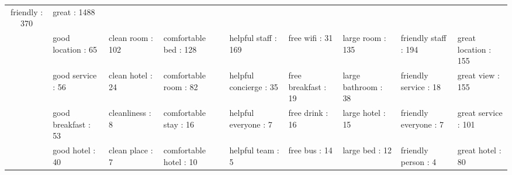 \documentclass[smallextended,natbib]{svjour3}       %
\begin{document}
\begin{landscape}
\begin{table}[p]
{\begin{tabular}{|c|l|l|l|l|l|l|l|l|}
          friendly : 370 &
          great : 1488 \\
         &
          good location : 65 &
          clean room : 102 &
          comfortable bed : 128 &
          helpful staff : 169 &
          free wifi : 31 &
          large room : 135 &
          friendly staff : 194 &
          great location : 155 \\
         &
          good service : 56 &
          clean hotel : 24 &
          comfortable room : 82 &
          helpful concierge : 35 &
          free breakfast : 19 &
          large bathroom : 38 &
          friendly service : 18 &
          great view : 155 \\
         &
          good breakfast : 53 &
          cleanliness : 8 &
          comfortable stay : 16 &
          helpful everyone : 7 &
          free drink : 16 &
          large hotel : 15 &
          friendly everyone : 7 &
          great service : 101 \\
         &
          good hotel : 40 &
          clean place : 7 &
          comfortable hotel : 10 &
          helpful team : 5 &
          free bus : 14 &
          large bed : 12 &
          friendly person : 4 &
          great hotel : 80 \\ \hline
        \end{tabular}%
        }
    \end{table}
    \end{landscape}
\end{document}
